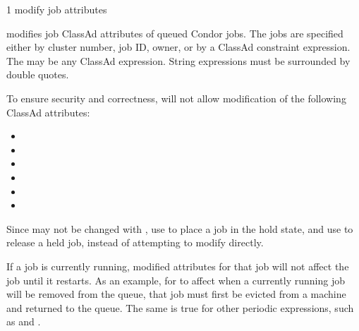 \begin{ManPage}{\label{man-condor-qedit}}{1}
{modify job attributes}
\Synopsis {}
\ToolDebugOption
{}
\Arg{\Dots}


\Description

 modifies job ClassAd attributes of queued Condor jobs.
The jobs are specified either by cluster number, job ID,
owner, or by a ClassAd constraint expression.
The  may be any ClassAd expression.
String expressions must be surrounded by double quotes.

To ensure security and correctness,
 will not allow modification of the following
ClassAd attributes:
\begin{itemize}
\item {}
\item {}
\item {}
\item {}
\item {}
\item {}
\end{itemize}

Since  may not be changed with ,
use  to place a job in the hold state,
and use  to release a held job,
instead of attempting to modify  directly.

If a job is currently running, modified attributes for that job will not 
affect the job until it restarts.
As an example, for
 to affect when a currently running job will be
removed from the queue, 
that job must first be evicted from a machine and returned to the queue.
The same is true for other periodic expressions, 
such as  and .

\begin{Options}
    \ToolDebugDesc
\end{Options}


\end{ManPage}
